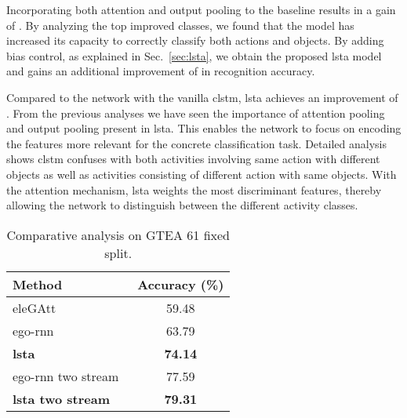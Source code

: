 \documentclass[10pt,twocolumn,letterpaper]{article}
\begin{document}
\begin{matrix*}[r]
Incorporating both attention and output pooling to the baseline results in a gain of . By analyzing the top improved classes, we found that the model has increased its capacity to correctly classify both actions and objects. By adding bias control, as explained in Sec.~\ref{sec:lsta}, we obtain the proposed \ac{lsta} model and gains an additional improvement of  in recognition accuracy.

Compared to the network with the vanilla \ac{clstm}, \ac{lsta} achieves an improvement of . From the previous analyses we have seen the importance of attention pooling and output pooling present in \ac{lsta}. This enables the network to focus on encoding the features more relevant for the concrete classification task. Detailed analysis shows \ac{clstm} confuses with both activities involving same action with different objects as well as activities consisting of different action with same objects. With the attention mechanism, \ac{lsta} weights the most discriminant features, thereby allowing the network to distinguish between the different activity classes.

\begin{table}[t]\small
	\centering
	\begin{tabular}{|l|c|}
		\hline
		Method & Accuracy (\%) \\ \hline \hline
        eleGAtt~\cite{attention_eccv18} & 59.48 \\ \hline
		ego-rnn~\cite{sudhakaran2018attention} & 63.79 \\ \hline
		\textbf{\ac{lsta}} & \textbf{74.14} \\ \hline \hline
		ego-rnn two stream~\cite{sudhakaran2018attention} & 77.59 \\ \hline
		\textbf{\ac{lsta} two stream} & \textbf{79.31} \\ \hline
	\end{tabular}
\vspace{-0.2cm}
	\caption{Comparative analysis on GTEA 61 fixed split.}
	\label{tab:comp}\vspace{-0.4cm}
\end{table}


\end{matrix*}
\end{document}
